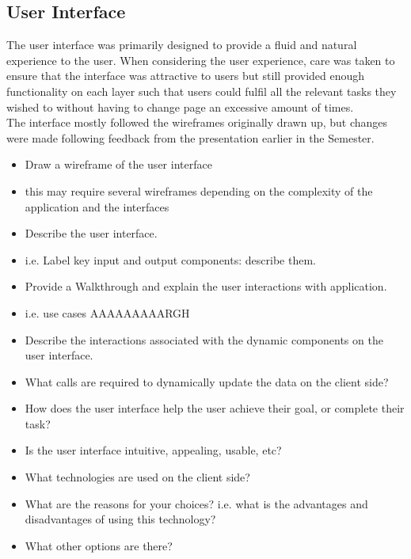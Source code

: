 \documentclass{sig-alt-release2}
\begin{document}
\subsection{User Interface}
The user interface was primarily designed to provide a fluid and natural experience to the user. When considering the user experience, care was taken to ensure that the interface was attractive to users but still provided enough functionality on each layer such that users could fulfil all the relevant tasks they wished to without having to change page an excessive amount of times. \\
The interface mostly followed the wireframes originally drawn up, but changes were made following feedback from the presentation earlier in the Semester. 
\begin{itemize}

\item	Draw a wireframe of the user interface 

\item	this may require several wireframes depending on the complexity of the application and the interfaces

\item	Describe the user interface.

\item	i.e. Label key input and output components: describe them.

\item	Provide a Walkthrough and explain the user interactions with application. 
\item	i.e. use cases AAAAAAAAARGH

\item	Describe the interactions associated with the dynamic components on the user interface.

\item	What calls are required to dynamically update the data on the client side?

\item	How does the user interface help the user achieve their goal, or complete their task? 

\item	Is the user interface intuitive, appealing, usable, etc?

\item	What technologies are used on the client side? 

\item	What are the reasons for your choices? i.e. what is the advantages and disadvantages of using this technology? 

\item	What other options are there? 

\end{itemize}
\end{document}
